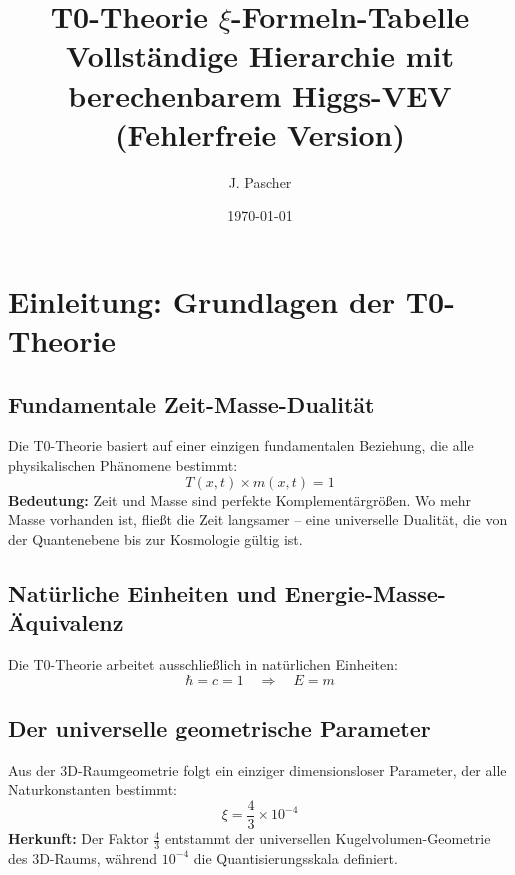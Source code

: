 \documentclass[12pt,a4paper]{article}
\begin{document}
	
	\title{\textbf{T0-Theorie $\xi$-Formeln-Tabelle}\\[0.5cm]
		\large Vollständige Hierarchie mit berechenbarem Higgs-VEV (Fehlerfreie Version)}
	\author{J. Pascher}
	\date{\today}
	
	\maketitle
	
	\section{Einleitung: Grundlagen der T0-Theorie}
	
	\subsection{Fundamentale Zeit-Masse-Dualität}
	Die T0-Theorie basiert auf einer einzigen fundamentalen Beziehung, die alle physikalischen Phänomene bestimmt:
	\begin{equation}
		\boxed{T(x,t) \times m(x,t) = 1}
	\end{equation}
	\textbf{Bedeutung:} Zeit und Masse sind perfekte Komplementärgrößen. Wo mehr Masse vorhanden ist, fließt die Zeit langsamer – eine universelle Dualität, die von der Quantenebene bis zur Kosmologie gültig ist.
	
	\subsection{Natürliche Einheiten und Energie-Masse-Äquivalenz}
	Die T0-Theorie arbeitet ausschließlich in natürlichen Einheiten:
	\begin{equation}
		\boxed{\hbar = c = 1 \quad \Rightarrow \quad E = m}
	\end{equation}
	
	\subsection{Der universelle geometrische Parameter}
	Aus der 3D-Raumgeometrie folgt ein einziger dimensionsloser Parameter, der alle Naturkonstanten bestimmt:
	\begin{equation}
		\boxed{\xi = \frac{4}{3} \times 10^{-4}}
	\end{equation}
	\textbf{Herkunft:} Der Faktor $\frac{4}{3}$ entstammt der universellen Kugelvolumen-Geometrie des 3D-Raums, während $10^{-4}$ die Quantisierungsskala definiert.
	
\end{document}
